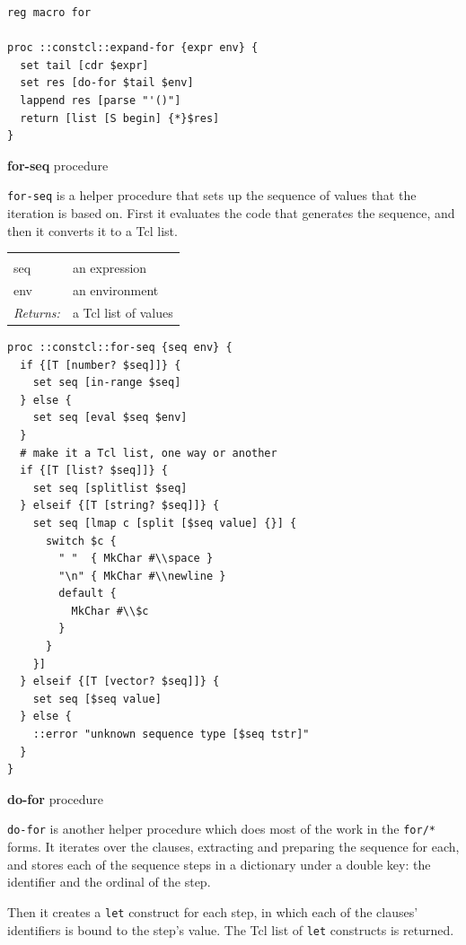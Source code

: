 \documentclass[twoside]{report}
\begin{document}
\begin{lstlisting}
reg macro for

proc ::constcl::expand-for {expr env} {
  set tail [cdr $expr]
  set res [do-for $tail $env]
  lappend res [parse "'()"]
  return [list [S begin] {*}$res]
}
\end{lstlisting}

\textbf{for-seq} procedure

\texttt{for-seq} is a helper procedure that sets up the sequence of values that the iteration is based on. First it evaluates the code that generates the sequence, and then it converts it to a Tcl list.

\noindent\begin{tabular}{ |p{1.9cm} p{8cm}| }
\hline
\rowcolor[HTML]{CCCCCC} \multicolumn{2}{|l|}{\bf for-seq (internal)} \\
seq & an expression \\
env & an environment \\
\textit{Returns:} & a Tcl list of values \\
\hline
\end{tabular}

\begin{lstlisting}
proc ::constcl::for-seq {seq env} {
  if {[T [number? $seq]]} {
    set seq [in-range $seq]
  } else {
    set seq [eval $seq $env]
  }
  # make it a Tcl list, one way or another
  if {[T [list? $seq]]} {
    set seq [splitlist $seq]
  } elseif {[T [string? $seq]]} {
    set seq [lmap c [split [$seq value] {}] {
      switch $c {
        " "  { MkChar #\\space }
        "\n" { MkChar #\\newline }
        default {
          MkChar #\\$c
        }
      }
    }]
  } elseif {[T [vector? $seq]]} {
    set seq [$seq value]
  } else {
    ::error "unknown sequence type [$seq tstr]"
  }
}
\end{lstlisting}

\textbf{do-for} procedure

\texttt{do-for} is another helper procedure which does most of the work in the \texttt{for/*} forms. It iterates over the clauses, extracting and preparing the sequence for each, and stores each of the sequence steps in a dictionary under a double key: the identifier and the ordinal of the step.

Then it creates a \texttt{let} construct for each step, in which each of the clauses' identifiers is bound to the step's value. The Tcl list of \texttt{let} constructs is returned.
\end{document}
